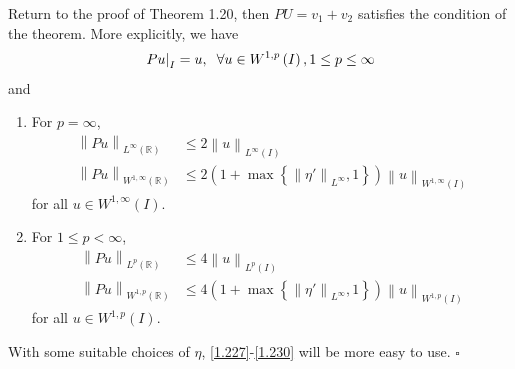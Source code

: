 \documentclass[a4paper,oneside]{article}
\numberwithin{equation}{section}
\begin{document}
Return to the proof of Theorem 1.20, then $PU=v_1 +v_2$ satisfies the condition of the theorem. More explicitly, we have
\begin{align}
{\left. {Pu} \right|_I} = u,\hspace{0.2cm}\forall u \in {W^{1,p}}\left( I \right),1 \le p \le \infty 
\end{align}
and
\begin{enumerate}
\item For $p=\infty$, 
\begin{align}
\label{1.227}
{\left\| {Pu} \right\|_{{L^\infty }\left( \mathbb{R} \right)}} &\le 2{\left\| u \right\|_{{L^\infty }\left( I \right)}}\\
{\left\| {Pu} \right\|_{{W^{1,\infty }}\left( \mathbb{R} \right)}} &\le 2\left( {1 + \max \left\{ {{{\left\| {\eta '} \right\|}_{{L^\infty }}},1} \right\}} \right){\left\| u \right\|_{{W^{1,\infty }}\left( I \right)}}
\end{align}
for all $u \in {W^{1,\infty }}\left( I \right)$.
\item For $1\le p<\infty$,
\begin{align}
{\left\| {Pu} \right\|_{{L^p}\left( \mathbb{R} \right)}} &\le 4{\left\| u \right\|_{{L^p}\left( I \right)}}\\
{\left\| {Pu} \right\|_{{W^{1,p}}\left( \mathbb{R} \right)}} &\le 4\left( {1 + \max \left\{ {{{\left\| {\eta '} \right\|}_{{L^\infty }}},1} \right\}} \right){\left\| u \right\|_{{W^{1,p}}\left( I \right)}} \label{1.230}
\end{align}
for all $u \in {W^{1,p}}\left( I \right)$. 
\end{enumerate}
With some suitable choices of $\eta$, \eqref{1.227}-\eqref{1.230} will be more easy to use. \hfill $\square$\\
\end{document}
